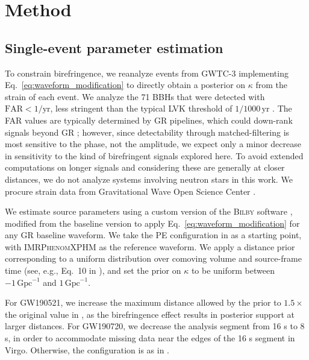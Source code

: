 \documentclass[aps,prd,twocolumn,superscriptaddress,preprintnumbers,nofootinbib]{revtex4-2}
\begin{document}
\section{Method}
\label{sec:Method}

\subsection{Single-event parameter estimation}

To constrain birefringence, we reanalyze events from GWTC-3 \citep{GWTC-2.1, GWTC-3} implementing Eq.~\eqref{eq:waveform_modification} to directly obtain a posterior on $\kappa$ from the strain of each event.
We analyze the 71 \acp{BBH} that were detected with $\mathrm{FAR} < 1/\mathrm{yr}$, less stringent than the typical \ac{LVK} threshold of $1/1000\,\mathrm{yr}$ \cite{LIGOScientific:2020tif,LIGOScientific:2021sio}.
The \ac{FAR} values are typically determined by \ac{GR} pipelines, which could down-rank signals beyond \ac{GR} \cite{LIGOScientific:2020tif,Chia:2020psj,tgrsel}; however, since detectability through matched-filtering is most sensitive to the phase, not the amplitude, we expect only a minor decrease in sensitivity to the kind of birefringent signals explored here.
To avoid extended computations on longer signals and considering these are generally at closer distances, we do not analyze systems involving neutron stars in this work.
We procure strain data from Gravitational Wave Open Science Center \citep{GWOSC}.

We estimate source parameters using a custom version of the \textsc{Bilby} software \citep{Bilby}, modified from the baseline version to apply Eq.~\eqref{eq:waveform_modification} for any \ac{GR} baseline waveform.
We take the \ac{PE} configuration in \citep{GWTC-2.1, GWTC-3, GWTC-2.1_dataset, GWTC-3_dataset} as a starting point, with \textsc{IMRPhenomXPHM} \citep{Pratten:2020ceb} as the reference waveform.
We apply a distance prior corresponding to a uniform distribution over comoving volume and source-frame time (see, e.g., Eq.~10 in \cite{LIGOScientific:2019zcs}), and set the prior on $\kappa$ to be uniform between $-1 \, \mathrm{Gpc}^{-1}$ and $1 \, \mathrm{Gpc}^{-1}$. 

For GW190521, we increase the maximum distance allowed by the prior to $1.5\times$ the original value in \cite{GWTC-2.1_dataset}, as the birefringence effect results in posterior support at larger distances.
For GW190720, we decrease the analysis segment from 16 s to 8 s, in order to accommodate missing data near the edges of the 16 s segment in Virgo.
Otherwise, the configuration is as in \citep{GWTC-2.1, GWTC-3, GWTC-2.1_dataset, GWTC-3_dataset}.
\end{document}

